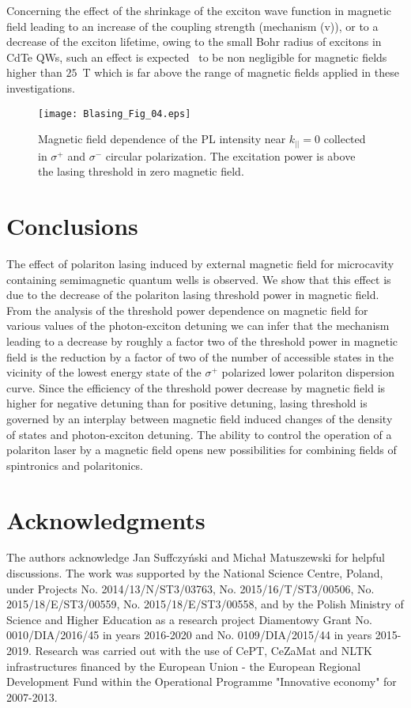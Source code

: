 \documentclass[amssymb,prb,twocolumn,floats,amsmath]{revtex4}
\begin{document}
Concerning the effect of the shrinkage of the exciton wave function in magnetic field leading to an increase of the coupling strength (mechanism (v)), or to a decrease of the exciton lifetime,\cite{Kochereshko_SciRep2016} owing to the small Bohr radius of excitons in CdTe QWs, such an effect is expected~\cite{Kavokin_MC2007} to be non negligible for magnetic fields higher than $25$~T which is far above the range of magnetic fields applied in these investigations.\\

\begin{figure}[t]
    \texttt{[image: Blasing\_Fig\_04.eps]}
  \caption{Magnetic field dependence of the PL intensity near $k_{||}=0$ collected in $\sigma^+$ and $\sigma^-$ circular polarization. The excitation power is above the lasing threshold in zero magnetic field.}
  \label{DOCP}
\end{figure}


\section{Conclusions}

The effect of polariton lasing induced by external magnetic field for microcavity containing semimagnetic quantum wells is observed. We show that this effect is due to the decrease of the polariton lasing threshold power in magnetic field. From the analysis of the threshold power dependence on magnetic field for various values of the photon-exciton detuning we can infer that the mechanism leading to a decrease by roughly a factor two of the threshold power in magnetic field is the reduction by a factor of two of the number of accessible states in the vicinity of the lowest energy state of the $\sigma^+$ polarized lower polariton dispersion curve. Since the efficiency of the threshold power decrease by magnetic field is higher for negative detuning than for positive detuning, lasing threshold is governed by an interplay between magnetic field induced changes of the density of states and photon-exciton detuning. The ability to control the operation of a polariton laser by a magnetic field opens new possibilities for combining fields of spintronics and polaritonics.


\section*{Acknowledgments}

The authors acknowledge Jan Suffczy\'{n}ski and Micha{\l} Matuszewski for helpful discussions. The work was supported by the National Science Centre, Poland, under Projects No. 2014/13/N/ST3/03763, No. 2015/16/T/ST3/00506, No. 2015/18/E/ST3/00559, No. 2015/18/E/ST3/00558, and by the Polish Ministry of Science and Higher Education as a research project Diamentowy Grant No. 0010/DIA/2016/45 in years 2016-2020 and No. 0109/DIA/2015/44 in years 2015-2019. Research was carried out with the use of CePT, CeZaMat and NLTK infrastructures financed by the European Union - the European Regional Development Fund within the Operational Programme "Innovative economy" for 2007-2013.
\end{document}
